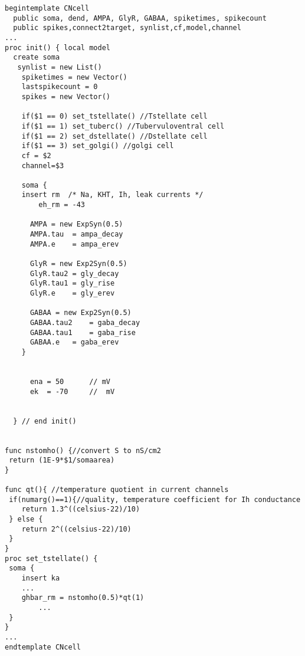 \begin{lstlisting}[label=lst:CellTemplate,caption=Rothman and Manis cochlear nucleus cell template (in CNcell.tem)]
begintemplate CNcell
  public soma, dend, AMPA, GlyR, GABAA, spiketimes, spikecount
  public spikes,connect2target, synlist,cf,model,channel
...
proc init() { local model
  create soma
   synlist = new List()
    spiketimes = new Vector()
    lastspikecount = 0
    spikes = new Vector()
    
    if($1 == 0) set_tstellate() //Tstellate cell
    if($1 == 1) set_tuberc() //Tubervuloventral cell
    if($1 == 2) set_dstellate() //Dstellate cell
    if($1 == 3) set_golgi() //golgi cell
    cf = $2
    channel=$3

    soma {
	insert rm  /* Na, KHT, Ih, leak currents */
        eh_rm = -43 

      AMPA = new ExpSyn(0.5)
      AMPA.tau  = ampa_decay
      AMPA.e 	= ampa_erev

      GlyR = new Exp2Syn(0.5)
      GlyR.tau2	= gly_decay
      GlyR.tau1	= gly_rise
      GlyR.e 	= gly_erev

      GABAA = new Exp2Syn(0.5)
      GABAA.tau2 	= gaba_decay
      GABAA.tau1 	= gaba_rise
      GABAA.e 	= gaba_erev
    }


      ena = 50		// mV
      ek  = -70		//  mV


  }	// end init()


func nstomho() {//convert S to nS/cm2
 return (1E-9*$1/somaarea)
}

func qt(){ //temperature quotient in current channels
 if(numarg()==1){//quality, temperature coefficient for Ih conductance	
 	return 1.3^((celsius-22)/10)
 } else {
	return 2^((celsius-22)/10)
 }
}
proc set_tstellate() {
 soma {
	insert ka
	...
	ghbar_rm = nstomho(0.5)*qt(1)
        ...  
 }
}
...
endtemplate CNcell 

\end{lstlisting}




